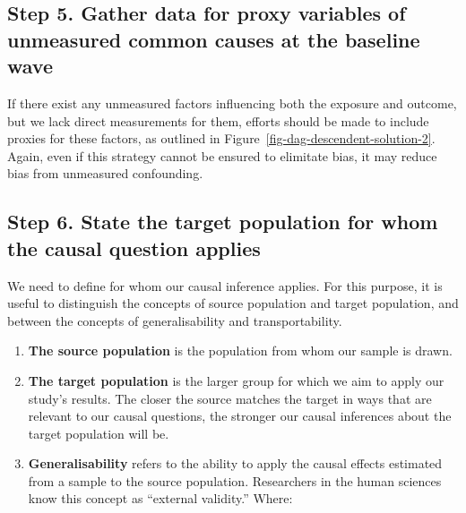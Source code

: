 \documentclass[
  singlecolumn]{report}
\begin{document}
\hypertarget{step-5.-gather-data-for-proxy-variables-of-unmeasured-common-causes-at-the-baseline-wave}{%
\subsection{Step 5. Gather data for proxy variables of unmeasured common
causes at the baseline
wave}\label{step-5.-gather-data-for-proxy-variables-of-unmeasured-common-causes-at-the-baseline-wave}}

If there exist any unmeasured factors influencing both the exposure and
outcome, but we lack direct measurements for them, efforts should be
made to include proxies for these factors, as outlined in
Figure~\ref{fig-dag-descendent-solution-2}. Again, even if this strategy
cannot be ensured to elimitate bias, it may reduce bias from unmeasured
confounding.

\hypertarget{step-6.-state-the-target-population-for-whom-the-causal-question-applies}{%
\subsection{Step 6. State the target population for whom the causal
question
applies}\label{step-6.-state-the-target-population-for-whom-the-causal-question-applies}}

We need to define for whom our causal inference applies. For this
purpose, it is useful to distinguish the concepts of source population
and target population, and between the concepts of generalisability and
transportability.

\begin{enumerate}
\def\labelenumi{\arabic{enumi}.}
\item
  \textbf{The source population} is the population from whom our sample
  is drawn.
\item
  \textbf{The target population} is the larger group for which we aim to
  apply our study's results. The closer the source matches the target in
  ways that are relevant to our causal questions, the stronger our
  causal inferences about the target population will be.
\item
  \textbf{Generalisability} refers to the ability to apply the causal
  effects estimated from a sample to the source population. Researchers
  in the human sciences know this concept as ``external validity.''
  Where:
\end{enumerate}
\end{document}
